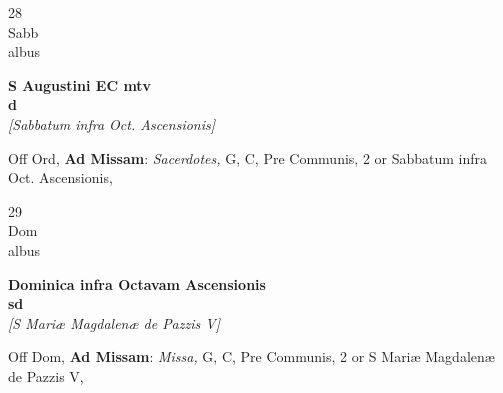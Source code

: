 \documentclass[10pt, openany]{book}
\begin{document}
        \begin{center}
            \begin{minipage}{3.5in}
                \vspace{2em}
                \begin{minipage}{0.5in}
                    {\Huge 28} \\
                    {\normalsize Sabb} \\
                    {\normalsize albus}
                \end{minipage}
                \begin{minipage}{3.0in}
                    \textbf{ \large S Augustini EC mtv \\
                    \textnormal{\normalsize d}} \\ \textit{[Sabbatum infra Oct. Ascensionis]} \\ 
                \end{minipage}
                \begin{justify}Off Ord, \textbf{Ad Missam}: \textit{Sacerdotes,} G, C, Pre Communis, 2 or Sabbatum infra Oct. Ascensionis,   
                \end{justify}
            \end{minipage}
        \end{center}
    
        \begin{center}
            \begin{minipage}{3.5in}
                \vspace{2em}
                \begin{minipage}{0.5in}
                    {\Huge 29} \\
                    {\normalsize Dom} \\
                    {\normalsize albus}
                \end{minipage}
                \begin{minipage}{3.0in}
                    \textbf{ \large Dominica infra Octavam Ascensionis \\
                    \textnormal{\normalsize sd}} \\ \textit{[S Mariæ Magdalenæ de Pazzis V]} \\ 
                \end{minipage}
                \begin{justify}Off Dom, \textbf{Ad Missam}: \textit{Missa,} G, C, Pre Communis, 2 or S Mariæ Magdalenæ de Pazzis V,   
                \end{justify}
            \end{minipage}
        \end{center}
    
\end{document}
